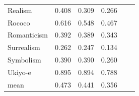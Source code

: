 \begin{table}[ht!]
\begin{tabular}{llllll}
Realism                        & 0.408            & 0.309  & 0.266      \\
Rococo                         & 0.616            & 0.548  & 0.467      \\
Romanticism                    & 0.392            & 0.389  & 0.343      \\
Surrealism                     & 0.262            & 0.247  & 0.134      \\
Symbolism                      & 0.390            & 0.390  & 0.260      \\
Ukiyo-e                        & 0.895            & 0.894  & 0.788      \\
\midrule
mean                           & 0.473            & 0.441  & 0.356      \\
\bottomrule
\end{tabular}

\end{table}

